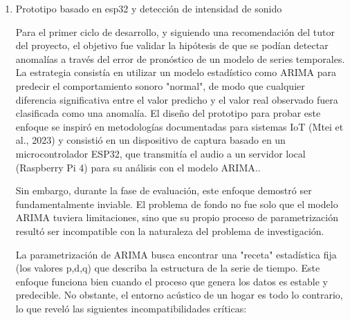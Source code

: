 \begin{enumerate}
  \item Prototipo basado en esp32 y detección de intensidad de sonido

        Para el primer ciclo de desarrollo, y siguiendo una recomendación del tutor del proyecto, el objetivo fue validar la hipótesis de que se podían detectar anomalías a través del error de pronóstico de un modelo de series temporales. La estrategia consistía en utilizar un modelo estadístico como ARIMA para predecir el comportamiento sonoro "normal", de modo que cualquier diferencia significativa entre el valor predicho y el valor real observado fuera clasificada como una anomalía. El diseño del prototipo para probar este enfoque se inspiró en metodologías documentadas para sistemas IoT (Mtei et al., 2023) y consistió en un dispositivo de captura basado en un microcontrolador ESP32, que transmitía el audio a un servidor local (Raspberry Pi 4) para su análisis con el modelo ARIMA..

        Sin embargo, durante la fase de evaluación, este enfoque demostró ser fundamentalmente inviable. El problema de fondo no fue solo que el modelo ARIMA tuviera limitaciones, sino que su propio proceso de parametrización resultó ser incompatible con la naturaleza del problema de investigación.

        La parametrización de ARIMA busca encontrar una "receta" estadística fija (los valores p,d,q) que describa la estructura de la serie de tiempo. Este enfoque funciona bien cuando el proceso que genera los datos es estable y predecible. No obstante, el entorno acústico de un hogar es todo lo contrario, lo que reveló las siguientes incompatibilidades críticas:


\end{enumerate}
